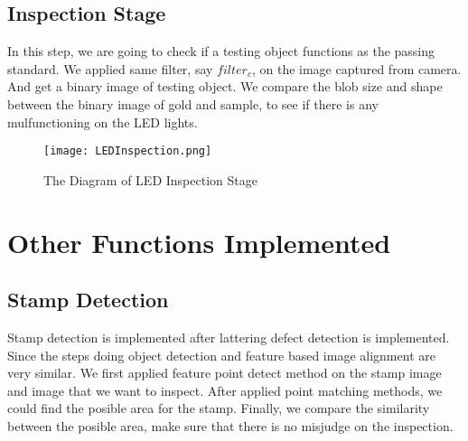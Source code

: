 	\subsection{Inspection Stage}
		In this step, we are going to check if a testing object functions as the passing standard.
		We applied same filter, say $filter_c$, on the image captured from camera. And get a binary image of testing object.
		We compare the blob size and shape between the binary image of gold and sample, to see if there is any mulfunctioning on the LED lights.
		\begin{figure}
			\texttt{[image: LEDInspection.png]}
			\caption{The Diagram of LED Inspection Stage}
			\label{fig:LEDInspection}
		\end{figure}

\section{Other Functions Implemented}
	\subsection{Stamp Detection}
		Stamp detection is implemented after lattering defect detection is implemented.
		Since the steps doing object detection and feature based image alignment are very similar.
		We first applied feature point detect method on the stamp image and image that we want to inspect.
		After applied point matching methods, we could find the posible area for the stamp.
		Finally, we compare the similarity between the posible area, make sure that there is no misjudge on the inspection.